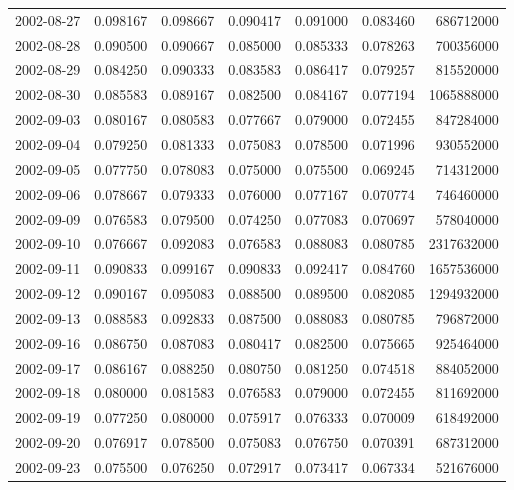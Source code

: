 \begin{tabular}{lrrrrrr}
2002-08-27 &    0.098167 &    0.098667 &    0.090417 &    0.091000 &    0.083460 &   686712000 \\
2002-08-28 &    0.090500 &    0.090667 &    0.085000 &    0.085333 &    0.078263 &   700356000 \\
2002-08-29 &    0.084250 &    0.090333 &    0.083583 &    0.086417 &    0.079257 &   815520000 \\
2002-08-30 &    0.085583 &    0.089167 &    0.082500 &    0.084167 &    0.077194 &  1065888000 \\
2002-09-03 &    0.080167 &    0.080583 &    0.077667 &    0.079000 &    0.072455 &   847284000 \\
2002-09-04 &    0.079250 &    0.081333 &    0.075083 &    0.078500 &    0.071996 &   930552000 \\
2002-09-05 &    0.077750 &    0.078083 &    0.075000 &    0.075500 &    0.069245 &   714312000 \\
2002-09-06 &    0.078667 &    0.079333 &    0.076000 &    0.077167 &    0.070774 &   746460000 \\
2002-09-09 &    0.076583 &    0.079500 &    0.074250 &    0.077083 &    0.070697 &   578040000 \\
2002-09-10 &    0.076667 &    0.092083 &    0.076583 &    0.088083 &    0.080785 &  2317632000 \\
2002-09-11 &    0.090833 &    0.099167 &    0.090833 &    0.092417 &    0.084760 &  1657536000 \\
2002-09-12 &    0.090167 &    0.095083 &    0.088500 &    0.089500 &    0.082085 &  1294932000 \\
2002-09-13 &    0.088583 &    0.092833 &    0.087500 &    0.088083 &    0.080785 &   796872000 \\
2002-09-16 &    0.086750 &    0.087083 &    0.080417 &    0.082500 &    0.075665 &   925464000 \\
2002-09-17 &    0.086167 &    0.088250 &    0.080750 &    0.081250 &    0.074518 &   884052000 \\
2002-09-18 &    0.080000 &    0.081583 &    0.076583 &    0.079000 &    0.072455 &   811692000 \\
2002-09-19 &    0.077250 &    0.080000 &    0.075917 &    0.076333 &    0.070009 &   618492000 \\
2002-09-20 &    0.076917 &    0.078500 &    0.075083 &    0.076750 &    0.070391 &   687312000 \\
2002-09-23 &    0.075500 &    0.076250 &    0.072917 &    0.073417 &    0.067334 &   521676000 \\

\end{tabular}
